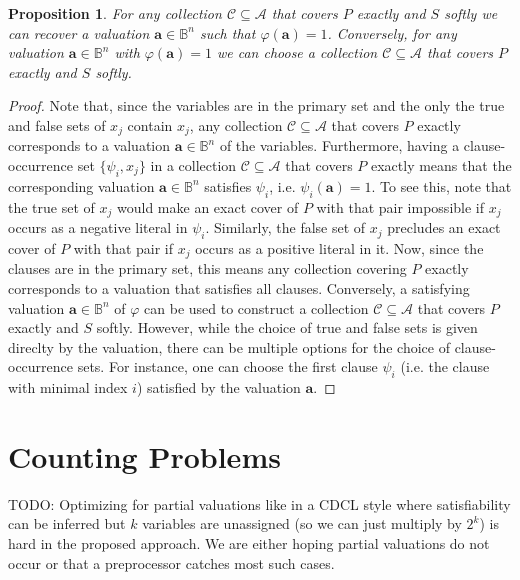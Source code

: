 \documentclass[a4paper]{article}
\newtheorem{proposition}{Proposition}
\renewcommand{\vec}[1]{\boldsymbol{#1}}
\begin{document}
\begin{proposition}
  For any collection $\mathcal{C} \subseteq \mathcal{A}$ that covers $P$
  exactly and $S$ softly we can recover a valuation $\vec{a} \in \mathbb{B}^n$
  such that $\varphi(\vec{a}) = 1$. Conversely, for any valuation $\vec{a} \in
  \mathbb{B}^n$ with $\varphi(\vec{a}) = 1$ we can choose a collection
  $\mathcal{C} \subseteq \mathcal{A}$ that covers $P$ exactly and $S$ softly.
\end{proposition}
\begin{proof}
  Note that, since the variables are in the primary set and the only the true
  and false sets of $x_j$ contain $x_j$, any collection $\mathcal{C} \subseteq
  \mathcal{A}$ that
  covers $P$ exactly corresponds to a valuation $\vec{a} \in \mathbb{B}^n$ of
  the variables. Furthermore, having a clause-occurrence set $\{\psi_i, x_j\}$
  in a collection $\mathcal{C} \subseteq \mathcal{A}$ that covers $P$ exactly means that the
  corresponding valuation $\vec{a} \in \mathbb{B}^n$ satisfies $\psi_i$, i.e.
  $\psi_i(\vec{a}) = 1$. To see this, note that the true set of $x_j$ would make
  an exact cover of $P$ with that pair impossible if $x_j$ occurs as a negative
  literal in $\psi_i$. Similarly, the false set of $x_j$ precludes an exact
  cover of $P$ with that pair if $x_j$ occurs as a positive literal in it.  Now,
  since the clauses are in the primary set, this means any collection covering
  $P$ exactly corresponds to a valuation that satisfies all clauses. Conversely,
  a satisfying valuation $\vec{a} \in \mathbb{B}^n$ of $\varphi$ can be used to
  construct a collection $\mathcal{C} \subseteq \mathcal{A}$ that covers $P$
  exactly and $S$ softly. However, while the choice of true and false sets is given direclty by
  the valuation, there can be multiple options for the choice of
  clause-occurrence sets. For instance, one can choose the first clause $\psi_i$
  (i.e. the clause with minimal index $i$) satisfied by the valuation $\vec{a}$.
\end{proof}


\section{Counting Problems}

TODO: Optimizing for partial valuations like in a CDCL style where
satisfiability can be inferred but $k$ variables are unassigned (so we can
just multiply by $2^k$) is hard in the proposed approach. We are either hoping
partial valuations do not occur or that a preprocessor catches most such
cases.
\end{document}
